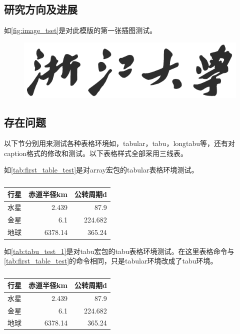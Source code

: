 		\subsection{研究方向及进展} %
		\label{sub:研究方向及进展}
			如\autoref{fig:image_tset}是对此模版的第一张插图测试。

			\begin{figure}[htbp]
				\centering
				\includegraphics[width = 0.5\linewidth]{./style/logo/ZJDX.pdf}
				\caption{}
				\label{fig:image_tset}
			\end{figure}
		\subsection{存在问题} %
		\label{sub:存在问题}
			以下节分别用来测试各种表格环境如，tabular，tabu，longtabu等，还有对caption格式的修改和测试。以下表格样式全部采用三线表。

			
			如\autoref{tab:first_table_test}是对array宏包的tabular表格环境测试。
			\begin{table}[htbp]
				\centering
				\renewcommand{\arraystretch}{0.625}
				\caption{}
				\label{tab:first_table_test}
			    \begin{tabular}{lrr}
			    \toprule
			    \textbf{行星}     & \textbf{赤道半径}km & \textbf{公转周期}d \\
			    \midrule
			    水星     & 2.439  & 87.9 \\
			    金星     & 6.1    & 224.682 \\
			    地球     & 6378.14 & 365.24 \\
			    \bottomrule
			    \end{tabular}%
			\end{table}

			
			如\autoref{tab:tabu_test_1}是对tabu宏包的tabu表格环境测试。在这里表格命令与\autoref{tab:first_table_test}的命令相同，只是tabular环境改成了tabu环境。
			\begin{table}[htbp]
				\centering
				\renewcommand{\arraystretch}{0.625}
				\caption{}
				\label{tab:tabu_test_1}
			    \begin{tabu}{lrr}
			    \toprule
			    \textbf{行星}     & \textbf{赤道半径}km & \textbf{公转周期}d \\
			    \midrule
			    水星     & 2.439  & 87.9 \\
			    金星     & 6.1    & 224.682 \\
			    地球     & 6378.14 & 365.24 \\
			    \bottomrule
			    \end{tabu}%
			\end{table}
	\newpage
